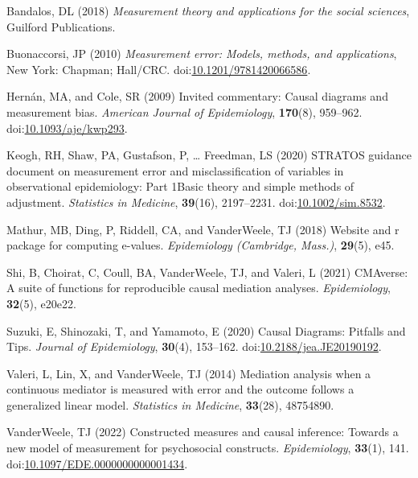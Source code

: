 \documentclass[
  singlecolumn,
  9pt]{article}
\newlength{\cslhangindent}
\newenvironment{CSLReferences}[2] %
 {\begin{list}{}{%
  \setlength{\itemindent}{0pt}
  \setlength{\leftmargin}{0pt}
  \setlength{\parsep}{0pt}
  \ifodd #1
   \setlength{\leftmargin}{\cslhangindent}
   \setlength{\itemindent}{-1\cslhangindent}
  \fi
  \setlength{\itemsep}{#2\baselineskip}}}
 {\end{list}}
\begin{document}
\label{refs}
\begin{CSLReferences}{1}{0}
Bandalos, DL (2018) \emph{Measurement theory and applications for the
social sciences}, Guilford Publications.

Buonaccorsi, JP (2010) \emph{Measurement error: Models, methods, and
applications}, New York: Chapman; Hall/CRC.
doi:\href{https://doi.org/10.1201/9781420066586}{10.1201/9781420066586}.

Hernán, MA, and Cole, SR (2009) Invited commentary: Causal diagrams and
measurement bias. \emph{American Journal of Epidemiology},
\textbf{170}(8), 959--962.
doi:\href{https://doi.org/10.1093/aje/kwp293}{10.1093/aje/kwp293}.

Keogh, RH, Shaw, PA, Gustafson, P, \ldots{} Freedman, LS (2020) STRATOS
guidance document on measurement error and misclassification of
variables in observational epidemiology: Part 1{\textemdash}Basic theory
and simple methods of adjustment. \emph{Statistics in Medicine},
\textbf{39}(16), 2197--2231.
doi:\href{https://doi.org/10.1002/sim.8532}{10.1002/sim.8532}.

Mathur, MB, Ding, P, Riddell, CA, and VanderWeele, TJ (2018) Website and
r package for computing e-values. \emph{Epidemiology (Cambridge,
Mass.)}, \textbf{29}(5), e45.

Shi, B, Choirat, C, Coull, BA, VanderWeele, TJ, and Valeri, L (2021)
CMAverse: A suite of functions for reproducible causal mediation
analyses. \emph{Epidemiology}, \textbf{32}(5), e20e22.

Suzuki, E, Shinozaki, T, and Yamamoto, E (2020) Causal Diagrams:
Pitfalls and Tips. \emph{Journal of Epidemiology}, \textbf{30}(4),
153--162.
doi:\href{https://doi.org/10.2188/jea.JE20190192}{10.2188/jea.JE20190192}.

Valeri, L, Lin, X, and VanderWeele, TJ (2014) Mediation analysis when a
continuous mediator is measured with error and the outcome follows a
generalized linear model. \emph{Statistics in Medicine},
\textbf{33}(28), 48754890.

VanderWeele, TJ (2022) Constructed measures and causal inference:
Towards a new model of measurement for psychosocial constructs.
\emph{Epidemiology}, \textbf{33}(1), 141.
doi:\href{https://doi.org/10.1097/EDE.0000000000001434}{10.1097/EDE.0000000000001434}.


\end{CSLReferences}
\end{document}

